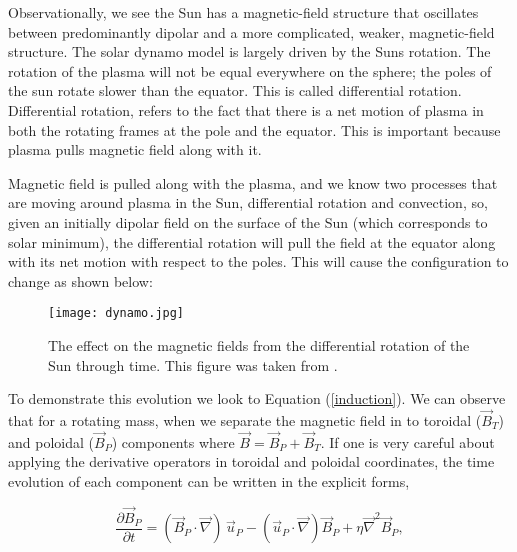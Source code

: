 \documentclass[%
 reprint,
 amsmath,amssymb,
 aps,
]{revtex4-1}
\begin{document}
Observationally, we see the Sun has a magnetic-field structure that oscillates between predominantly dipolar and a more complicated, weaker, magnetic-field structure. The solar dynamo model is largely driven by the Suns rotation. The rotation of the plasma will not be equal everywhere on the sphere; the poles of the sun rotate slower than the equator. This is called differential rotation. Differential rotation, refers to the fact that there is a net motion of plasma in both the rotating frames at the pole and the equator. This is important because plasma pulls magnetic field along with it.


Magnetic field is pulled along with the plasma, and we know two processes that are moving around plasma in the Sun, differential rotation and convection, so, given an initially dipolar field on the surface of the Sun (which corresponds to solar minimum), the differential rotation will pull the field at the equator along with its net motion with respect to the poles. This will cause the configuration to change as shown below:

\begin{center}
\begin{figure}[h]
\texttt{[image: dynamo.jpg]}
\caption{The effect on the magnetic fields from the differential rotation of the Sun through time. This figure was taken from \cite{dynamo}.}
\end{figure}
\end{center}

To demonstrate this evolution we look to Equation (\ref{induction}). We can observe that for a rotating mass, when we separate the magnetic field in to toroidal ($\vec{B} _T$) and poloidal ($\vec{B} _P$) components where $\vec{B} =  \vec{B} _P + \vec{B} _T $. If one is very careful about applying the derivative operators in toroidal and poloidal coordinates, the time evolution of each component can be written in the explicit forms,

\begin{equation} \label{dynamoP}
\frac{\partial \vec{B} _P}{\partial t} = (\vec{B} _P \cdot \vec{\nabla}) \, \vec{u} _P - (\vec{u} _P \cdot \vec{\nabla}) \vec{B} _P + \eta \vec{\nabla} ^2 \vec{B} _P ,
\end{equation} 
\end{document}
